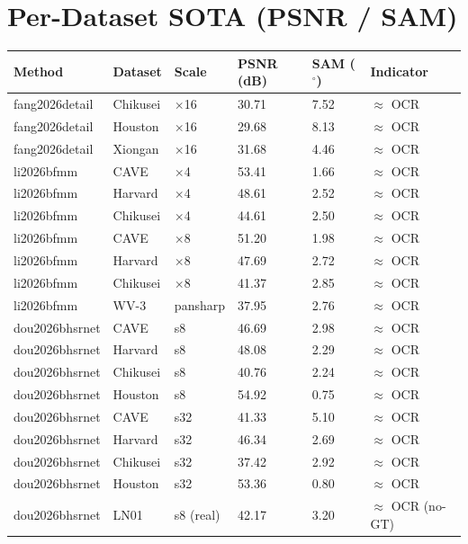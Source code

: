 \documentclass[11pt]{article}
\begin{document}
\normalsize

\section{Per-Dataset SOTA (PSNR / SAM)}
\small
\begin{longtable}{@{}p{2.6cm}p{2.6cm}p{1.6cm}p{2.0cm}p{1.9cm}p{3.1cm}@{}}
\toprule
\textbf{Method} & \textbf{Dataset} & \textbf{Scale} & \textbf{PSNR (dB)} & \textbf{SAM ($^\circ$)} & \textbf{Indicator} \\
\midrule
\endhead
\bottomrule
\endfoot
%
fang2026detail & Chikusei & $\times$16 & 30.71 & 7.52 & $\approx$ OCR \\
fang2026detail & Houston & $\times$16 & 29.68 & 8.13 & $\approx$ OCR \\
fang2026detail & Xiongan & $\times$16 & 31.68 & 4.46 & $\approx$ OCR \\
li2026bfmm & CAVE & $\times$4 & 53.41 & 1.66 & $\approx$ OCR \\
li2026bfmm & Harvard & $\times$4 & 48.61 & 2.52 & $\approx$ OCR \\
li2026bfmm & Chikusei & $\times$4 & 44.61 & 2.50 & $\approx$ OCR \\
li2026bfmm & CAVE & $\times$8 & 51.20 & 1.98 & $\approx$ OCR \\
li2026bfmm & Harvard & $\times$8 & 47.69 & 2.72 & $\approx$ OCR \\
li2026bfmm & Chikusei & $\times$8 & 41.37 & 2.85 & $\approx$ OCR \\
li2026bfmm & WV-3 & pansharp & 37.95 & 2.76 & $\approx$ OCR \\
dou2026bhsrnet & CAVE & s8 & 46.69 & 2.98 & $\approx$ OCR \\
dou2026bhsrnet & Harvard & s8 & 48.08 & 2.29 & $\approx$ OCR \\
dou2026bhsrnet & Chikusei & s8 & 40.76 & 2.24 & $\approx$ OCR \\
dou2026bhsrnet & Houston & s8 & 54.92 & 0.75 & $\approx$ OCR \\
dou2026bhsrnet & CAVE & s32 & 41.33 & 5.10 & $\approx$ OCR \\
dou2026bhsrnet & Harvard & s32 & 46.34 & 2.69 & $\approx$ OCR \\
dou2026bhsrnet & Chikusei & s32 & 37.42 & 2.92 & $\approx$ OCR \\
dou2026bhsrnet & Houston & s32 & 53.36 & 0.80 & $\approx$ OCR \\
dou2026bhsrnet & LN01 & s8 (real) & 42.17 & 3.20 & $\approx$ OCR (no-GT) \\

\end{longtable}
\end{document}
